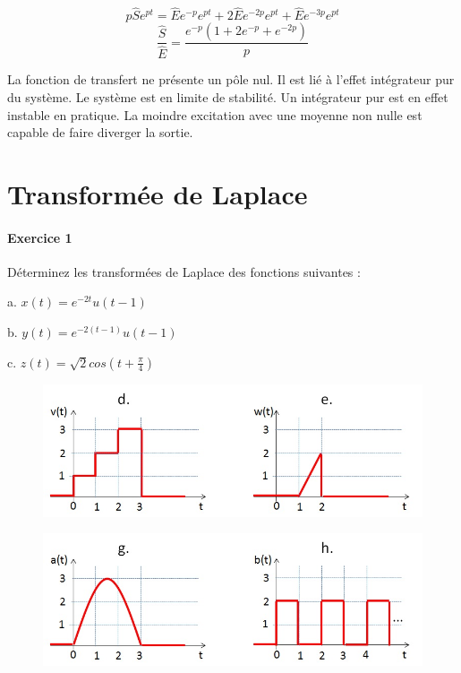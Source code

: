 \documentclass[11pt]{report}
\begin{document}
 	\begin{equation*}
 	p\hat{S}e^{pt}=\hat{E}e^{-p}e^{pt}+2\hat{E}e^{-2p}e^{pt}+\hat{E}e^{-3p}e^{pt}
 	\end{equation*}
 	\begin{equation*}
 	\frac{\hat{S}}{\hat{E}}=\frac{e^{-p}(1+2e^{-p}+e^{-2p})}{p}
 	\end{equation*}
 	
 	La fonction de transfert ne présente un pôle nul.  Il est lié à l'effet intégrateur pur du système. Le système est en limite de stabilité. Un intégrateur pur est en effet instable en pratique. La moindre excitation avec une moyenne non nulle est capable de faire diverger la sortie.
 	
 	
	
	\newpage
	
	\chapter{Transformée de Laplace}
	
	
	\subsubsection{Exercice 1}
	
	Déterminez les transformées de Laplace des fonctions suivantes :
	
	a. $x(t)=e^{-2t}u(t-1)$
	
	b. $y(t)=e^{-2(t-1)}u(t-1)$
	
	c. $z(t) = \sqrt{2}cos(t+\frac{\pi}{4})$
	
	\begin{figure}[h!]
		\centering
		\includegraphics[scale=0.5]{images/Exo_2_1_a.jpg} 
	\end{figure} 

	\begin{figure}[h!]
		\centering
		\includegraphics[scale=0.5]{images/Exo_2_1_b.jpg} 
	\end{figure}
	
\end{document}
